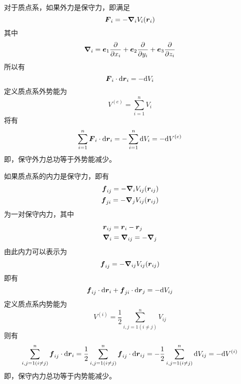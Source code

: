 对于质点系，如果外力是保守力，即满足
\begin{equation}
	\boldsymbol{F}_i = -\boldsymbol{\nabla}_i V_i(\boldsymbol{r}_i)
\end{equation}
其中
\begin{equation}
	\boldsymbol{\nabla}_i = \boldsymbol{e}_1 \frac{\partial}{\partial x_i} + \boldsymbol{e}_2 \frac{\partial}{\partial y_i} + \boldsymbol{e}_3 \frac{\partial}{\partial z_i}
\end{equation}
所以有
\begin{equation}
	\boldsymbol{F}_i \cdot \mathrm{d} \boldsymbol{r}_i = -\mathrm{d} V_i
\end{equation}
定义{\heiti 质点系外势能}为
\begin{equation}
	V^{(e)} = \sum_{i=1}^n V_i
\end{equation}
将有
\begin{equation}
	\sum_{i=1}^n \boldsymbol{F}_i \cdot \mathrm{d} \boldsymbol{r}_i = -\sum_{i=1}^n \mathrm{d} V_i = -\mathrm{d} V^{(e)}
\end{equation}
即，保守外力总功等于外势能减少。

如果质点系的内力是保守力，即有
\begin{align*}
	\boldsymbol{f}_{ij} = -\boldsymbol{\nabla}_i V_{ij}(\boldsymbol{r}_{ij}) \\
	\boldsymbol{f}_{ji} = -\boldsymbol{\nabla}_j V_{ij}(\boldsymbol{r}_{ij})
\end{align*}
为一对保守内力，其中
\begin{align*}
	& \boldsymbol{r}_{ij} = \boldsymbol{r}_i - \boldsymbol{r}_j \\
	& \boldsymbol{\nabla}_i = \boldsymbol{\nabla}_{ij} = -\boldsymbol{\nabla}_j
\end{align*}
由此内力可以表示为
\begin{equation*}
	\boldsymbol{f}_{ij} = -\boldsymbol{\nabla}_{ij} V_{ij}(\boldsymbol{r}_{ij})
\end{equation*}
即有
\begin{equation}
	\boldsymbol{f}_{ij} \cdot \mathrm{d} \boldsymbol{r}_i + \boldsymbol{f}_{ji} \cdot \mathrm{d} \boldsymbol{r}_j = -\mathrm{d} V_{ij}
\end{equation}
定义{\heiti 质点系内势能}为
\begin{equation}
	V^{(i)} = \frac12 \sum_{i,j=1(i \neq j)}^n V_{ij}
\end{equation}
则有
\begin{equation}
	\sum_{i,j=1(i\neq j)}^n \boldsymbol{f}_{ij} \cdot \mathrm{d} \boldsymbol{r}_i = \frac12 \sum_{i,j=1(i \neq j)}^n \boldsymbol{f}_{ij} \cdot \mathrm{d} \boldsymbol{r}_{ij} = -\frac12 \sum_{i,j=1(i\neq j)}^n \mathrm{d} V_{ij} = -\mathrm{d} V^{(i)}
\end{equation}
即，保守内力总功等于内势能减少。

